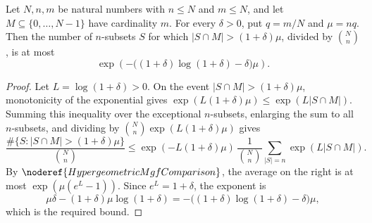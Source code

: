 \begin{helper}
Let \(N,n,m\) be natural numbers with \(n\le N\) and \(m\le N\), and let
\(M\subseteq \{0,\ldots,N-1\}\) have cardinality \(m\).  For every
\(\delta>0\), put \(q=m/N\) and \(\mu=nq\).  Then the number of \(n\)-subsets
\(S\) for which \(|S\cap M|>(1+\delta)\mu\), divided by \(\binom{N}{n}\), is at
most
\[
  \exp\!\left(-\bigl((1+\delta)\log(1+\delta)-\delta\bigr)\mu\right).
\]
\end{helper}
\begin{proof}
Let \(L=\log(1+\delta)>0\).  On the event
\(|S\cap M|>(1+\delta)\mu\), monotonicity of the exponential gives
\(\exp(L(1+\delta)\mu)\le \exp(L|S\cap M|)\).  Summing this inequality over
the exceptional \(n\)-subsets, enlarging the sum to all \(n\)-subsets, and
dividing by \(\binom{N}{n}\exp(L(1+\delta)\mu)\) gives
\[
  \frac{\#\{S: |S\cap M|>(1+\delta)\mu\}}{\binom{N}{n}}
  \le
  \exp(-L(1+\delta)\mu)\,
  \frac{1}{\binom{N}{n}}\sum_{|S|=n}\exp(L|S\cap M|).
\]
By \(\noderef{HypergeometricMgfComparison}\), the average on the right is at
most \(\exp(\mu(e^L-1))\).  Since \(e^L=1+\delta\), the exponent is
\[
  \mu\delta-(1+\delta)\mu\log(1+\delta)
  =
  -\bigl((1+\delta)\log(1+\delta)-\delta\bigr)\mu,
\]
which is the required bound.
\end{proof}
